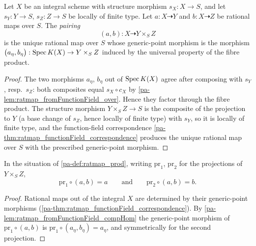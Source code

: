 \begin{definition}
  \label{pa-def:ratmap_prod}
  \leanok

  Let \(X\) be an integral scheme with structure morphism \(s_X : X \to S\), and
  let \(s_Y : Y \to S\), \(s_Z : Z \to S\) be locally of finite type. Let
  \(a : X \dashrightarrow Y\) and \(b : X \dashrightarrow Z\) be rational maps
  over \(S\). The \emph{pairing}
  \[
    (a, b) : X \dashrightarrow Y \times_S Z
  \]
  is the unique rational map over \(S\) whose generic-point morphism is the
  morphism \(\bigl(a_\eta, b_\eta\bigr) : \operatorname{Spec} K(X) \to Y \times_S Z\) induced
  by the universal property of the fibre product.
\end{definition}
\begin{proof}
  \leanok
  The two morphisms \(a_\eta\), \(b_\eta\) out of \(\operatorname{Spec} K(X)\) agree after
  composing with \(s_Y\), resp.\ \(s_Z\): both composites equal
  \(s_X \circ c_X\) by \ref{pa-lem:ratmap_fromFunctionField_over}. Hence they
  factor through the fibre product. The structure morphism
  \(Y \times_S Z \to S\) is the composite of the projection to \(Y\) (a base
  change of \(s_Z\), hence locally of finite type) with \(s_Y\), so it is
  locally of finite type, and the function-field correspondence
  \ref{pa-thm:ratmap_functionField_correspondence} produces the unique rational
  map over \(S\) with the prescribed generic-point morphism.
\end{proof}

\begin{lemma}
  \label{pa-lem:ratmap_prod_proj}
  \leanok

  In the situation of \ref{pa-def:ratmap_prod}, writing \(\mathrm{pr}_1\),
  \(\mathrm{pr}_2\) for the projections of \(Y \times_S Z\),
  \[
    \mathrm{pr}_1 \circ (a,b) = a
    \qquad\text{and}\qquad
    \mathrm{pr}_2 \circ (a,b) = b .
  \]
\end{lemma}
\begin{proof}
  \leanok
  Rational maps out of the integral \(X\) are determined by their generic-point
  morphisms (\ref{pa-thm:ratmap_functionField_correspondence}). By
  \ref{pa-lem:ratmap_fromFunctionField_compHom} the generic-point morphism of
  \(\mathrm{pr}_1 \circ (a,b)\) is \(\mathrm{pr}_1 \circ (a_\eta, b_\eta) =
  a_\eta\), and symmetrically for the second projection.
\end{proof}

